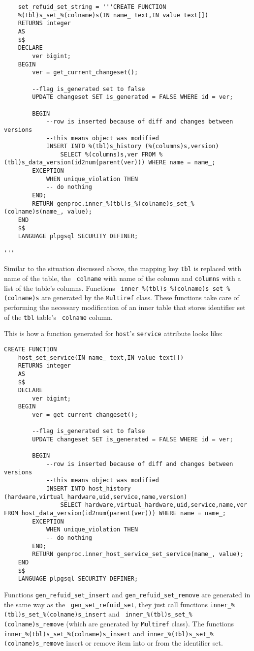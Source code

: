 \documentclass[deska]{subfiles}
\begin{document}
\begin{verbatim}
    set_refuid_set_string = '''CREATE FUNCTION
    %(tbl)s_set_%(colname)s(IN name_ text,IN value text[])
    RETURNS integer
    AS
    $$
    DECLARE
        ver bigint;
    BEGIN
        ver = get_current_changeset();

        --flag is_generated set to false
        UPDATE changeset SET is_generated = FALSE WHERE id = ver;

        BEGIN
            --row is inserted because of diff and changes between versions
            --this means object was modified
            INSERT INTO %(tbl)s_history (%(columns)s,version)
                SELECT %(columns)s,ver FROM %(tbl)s_data_version(id2num(parent(ver))) WHERE name = name_;
        EXCEPTION
            WHEN unique_violation THEN
            -- do nothing
        END;
        RETURN genproc.inner_%(tbl)s_%(colname)s_set_%(colname)s(name_, value);
    END
    $$
    LANGUAGE plpgsql SECURITY DEFINER;

'''
\end{verbatim}

Similar to the situation discussed above, the mapping key {\tt tbl} is replaced with name of the table, the {\tt
colname} with name of the column and {\tt columns} with a list of the table's columns.  Functions {\tt
inner\_\%(tbl)s\_\%(colname)s\_set\_\%(colname)s} are generated by the {\tt Multiref} class.   These functions take care
of performing the necessary modification of an inner table that stores identifier set of the {\tt tbl} table's {\tt
colname} column.

This is how a function generated for {\tt host}'s {\tt service} attribute looks like:

\begin{verbatim}
CREATE FUNCTION
    host_set_service(IN name_ text,IN value text[])
    RETURNS integer
    AS
    $$
    DECLARE
        ver bigint;
    BEGIN
        ver = get_current_changeset();

        --flag is_generated set to false
        UPDATE changeset SET is_generated = FALSE WHERE id = ver;

        BEGIN
            --row is inserted because of diff and changes between versions
            --this means object was modified
            INSERT INTO host_history (hardware,virtual_hardware,uid,service,name,version)
                SELECT hardware,virtual_hardware,uid,service,name,ver FROM host_data_version(id2num(parent(ver))) WHERE name = name_;
        EXCEPTION
            WHEN unique_violation THEN
            -- do nothing
        END;
        RETURN genproc.inner_host_service_set_service(name_, value);
    END
    $$
    LANGUAGE plpgsql SECURITY DEFINER;
\end{verbatim}

Functions {\tt gen\_refuid\_set\_insert} and {\tt gen\_refuid\_set\_remove} are generated in the same way as the {\tt
gen\_set\_refuid\_set}, they just call functions {\tt inner\_\%(tbl)s\_set\_\%(colname)s\_insert} and {\tt
inner\_\%(tbl)s\_set\_\%(colname)s\_remove} (which are generated by {\tt Multiref} class).  The functions {\tt
inner\_\%(tbl)s\_set\_\%(colname)s\_insert} and {\tt inner\_\%(tbl)s\_set\_\%(colname)s\_remove} insert or remove item
into or from the identifier set.
\end{document}
